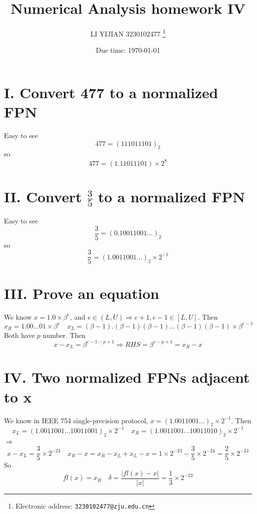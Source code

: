 \documentclass[a4paper]{article}
\begin{document}
\title{Numerical Analysis homework IV}

\author{LI YIJIAN 3230102477
  \thanks{Electronic address: \texttt{3230102477@zju.edu.cn}}}


\date{Due time: \today}
\maketitle





\section*{I. Convert 477 to a normalized FPN}
Easy to see
\[
477 = (111011101)_2
\]
so
\[
477 = (1.11011101)\times 2^8
\]
\section*{II. Convert $\frac{3}{5}$ to a normalized FPN}
Easy to see
\[
\frac{3}{5} = (0.10011001\ldots)_2
\]
so
\[
\frac{3}{5} = (1.0011001\ldots)_2 \times 2^{-1}
\]


\section*{III. Prove an equation}
We know $x = 1.0 \times \beta^e$, and $e\in (L,U) \Rightarrow e+1,e-1\in[L,U]$. Then
\[
x_{R} = 1.00\ldots01 \times \beta^e \quad
x_{L} = (\beta-1).(\beta-1)(\beta-1)\ldots(\beta-1)(\beta-1) \times \beta^{e-1} \quad
\]
Both have $p$ number. Then
\[
x - x_{L} = \beta^{e-1-p+1} \Rightarrow
RHS = \beta^{e-p+1}
= x_{R} - x 
\]




\section*{IV. Two normalized FPNs adjacent to x}
We know in IEEE 754 single-precision protocol,
$x = (1.0011001\ldots)_2 \times 2^{-1}$. Then
\[
x_{L} = (1.0011001\ldots10011001)_2 \times 2^{-1} \quad
x_{R} = (1.0011001\ldots10011010)_2 \times 2^{-1}
\]
$\Rightarrow$
\[
x - x_{L} = \frac{3}{5} \times 2^{-24} \quad
x_{R} - x = x_{R} - x_{L} + x_{L} - x = 1 \times 2^{-23} - \frac{3}{5} \times 2^{-24} = \frac{2}{5} \times 2^{-24}
\]
So
\[
fl(x) = x_{R} \quad \delta = \frac{|fl(x) - x|}{|x|} = \frac{1}{3} \times 2^{-23}
\]
\end{document}
